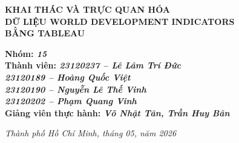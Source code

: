 \begin{titlepage}
\begin{center}
{\fontsize{18}{22}\selectfont\bfseries\color{navyblue}
KHAI THÁC VÀ TRỰC QUAN HÓA\\[0.25cm]
DỮ LIỆU WORLD DEVELOPMENT INDICATORS\\[0.25cm]
BẰNG TABLEAU}

\end{center}

\vspace*{\fill}

\begin{flushleft}
\hspace{2.5cm}
{\fontsize{12}{16}\selectfont\bfseries\color{navyblue}
Nhóm: \textit{15}}\\[0.2cm]
\hspace{2.5cm}
{\fontsize{12}{16}\selectfont\bfseries\color{navyblue}
Thành viên: \textit{23120237 -- Lê Lâm Trí Đức}}\\[0.08cm]
\hspace{2.5cm}
{\fontsize{12}{16}\selectfont\bfseries\color{navyblue}
\phantom{Thành viên: }\textit{23120189 -- Hoàng Quốc Việt}}\\[0.08cm]
\hspace{2.5cm}
{\fontsize{12}{16}\selectfont\bfseries\color{navyblue}
\phantom{Thành viên: }\textit{23120190 -- Nguyễn Lê Thế Vinh}}\\[0.08cm]
\hspace{2.5cm}
{\fontsize{12}{16}\selectfont\bfseries\color{navyblue}
\phantom{Thành viên: }\textit{23120202 -- Phạm Quang Vinh}}\\[0.2cm]
\hspace{2.5cm}
{\fontsize{12}{16}\selectfont\bfseries\color{navyblue}
Giảng viên thực hành: \textit{Võ Nhật Tân, Trần Huy Bân}}
\end{flushleft}

\vspace{0.8cm}

\begin{center}
{\fontsize{11}{13}\selectfont\itshape\color{navyblue}
Thành phố Hồ Chí Minh, tháng 05, năm 2026}
\end{center}

\vspace{0.4cm}

\end{titlepage}
